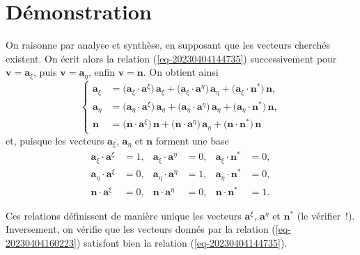 \documentclass[
  a4paper,
  DIV=11,
  numbers=noendperiod]{scrreprt}
\renewcommand{\vec}[1]{\symbf{#1}}
\begin{document}
\begin{tcolorbox}[enhanced jigsaw, toptitle=1mm, title=\textcolor{quarto-callout-tip-color}{\faLightbulb}\hspace{0.5em}{Astuce}, colbacktitle=quarto-callout-tip-color!10!white, toprule=.15mm, left=2mm, bottomrule=.15mm, arc=.35mm, breakable, opacityback=0, colframe=quarto-callout-tip-color-frame, bottomtitle=1mm, titlerule=0mm, leftrule=.75mm, opacitybacktitle=0.6, coltitle=black, rightrule=.15mm, colback=white]


\hypertarget{duxe9monstration-6}{%
\chapter{Démonstration}\label{duxe9monstration-6}}

On raisonne par analyse et synthèse, en supposant que les vecteurs
cherchés existent. On écrit alors la relation (\ref{eq-20230404144735})
successivement pour \(\vec{v} = \vec{a}_ξ\), puis
\(\vec{v} = \vec{a}_η\), enfin \(\vec{v} = \vec{n}\). On obtient ainsi
\[
\left\{
\begin{aligned}
\vec{a}_ξ &= \bigl( \vec{a}_ξ ⋅ \vec{a}^ξ \bigr) \, \vec{a}_ξ + \bigl( \vec{a}_ξ ⋅ \vec{a}^η \bigr) \, \vec{a}_η + \bigl( \vec{a}_ξ ⋅ \vec{n}^* \bigr) \, \vec{n},\\
\vec{a}_η &= \bigl( \vec{a}_η ⋅ \vec{a}^ξ \bigr) \, \vec{a}_η + \bigl( \vec{a}_η ⋅ \vec{a}^η \bigr) \, \vec{a}_η + \bigl( \vec{a}_η ⋅ \vec{n}^* \bigr) \, \vec{n},\\
\vec{n} &= \bigl( \vec{n} ⋅ \vec{a}^ξ \bigr) \, \vec{n} + \bigl( \vec{n} ⋅ \vec{a}^η \bigr) \, \vec{a}_η + \bigl( \vec{n} ⋅ \vec{n}^* \bigr) \, \vec{n}
\end{aligned}
\right.
\] et, puisque les vecteurs \(\vec{a}_ξ\), \(\vec{a}_η\) et \(\vec{n}\)
forment une base \[
\begin{aligned}
\vec{a}_ξ ⋅ \vec{a}^ξ &= 1, & \vec{a}_ξ ⋅ \vec{a}^η &= 0, & \vec{a}_ξ ⋅ \vec{n}^* &= 0,\\
\vec{a}_η ⋅ \vec{a}^ξ &= 0, & \vec{a}_η ⋅ \vec{a}^η &= 1, & \vec{a}_η ⋅ \vec{n}^* &= 0,\\
\vec{n}   ⋅ \vec{a}^ξ &= 0, & \vec{n}   ⋅ \vec{a}^η &= 0, & \vec{n}   ⋅ \vec{n}^* &= 1.
\end{aligned}
\]

Ces relations définissent de manière unique les vecteurs \(\vec{a}^ξ\),
\(\vec{a}^η\) et \(\vec{n}^*\) (le vérifier~!). Inversement, on vérifie
que les vecteurs donnés par la relation (\ref{eq-20230404160223})
satisfont bien la relation (\ref{eq-20230404144735}).

\end{tcolorbox}
\end{document}
